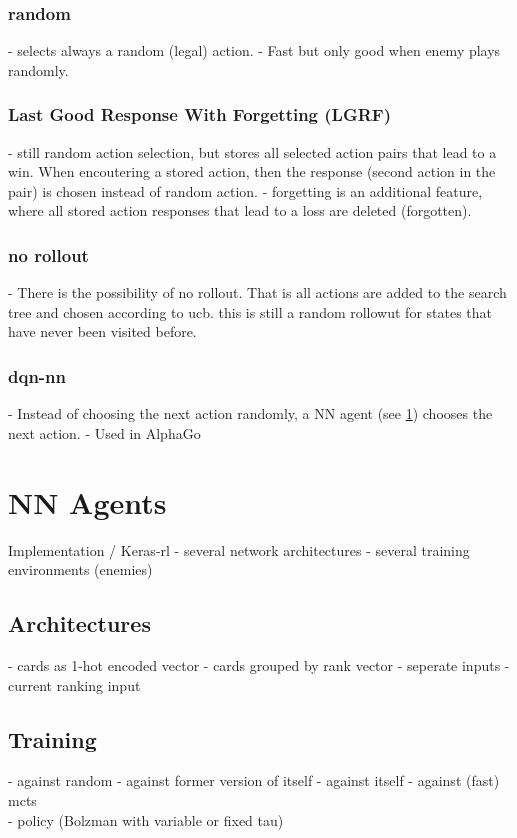 \subsubsection{random}
- selects always a random (legal) action.
- Fast but only good when enemy plays randomly.

\subsubsection{Last Good Response With Forgetting (LGRF)}
- still random action selection, but stores all selected action pairs that lead to a win. When encoutering a stored action, then the response (second action in the pair) is chosen instead of random action.
- forgetting is an additional feature, where all stored action responses that lead to a loss are deleted (forgotten).

\subsubsection{no rollout}
- There is the possibility of no rollout. That is all actions are added to the search tree and chosen according to ucb. this is still a random rollowut for states that have never been visited before.

\subsubsection{dqn-nn}
- Instead of choosing the next action randomly, a NN agent (see \ref{sec:nn_agents}) chooses the next action.
- Used in AlphaGo




\section{NN Agents}
\label{sec:nn_agents}
Implementation / Keras-rl
- several network architectures
- several training environments (enemies)


\subsection{Architectures}
- cards as 1-hot encoded vector
- cards grouped by rank vector
- seperate inputs
- current ranking input

\subsection{Training}
- against random
- against former version of itself
- against itself
- against (fast) mcts \\

- policy (Bolzman with variable or fixed tau)


